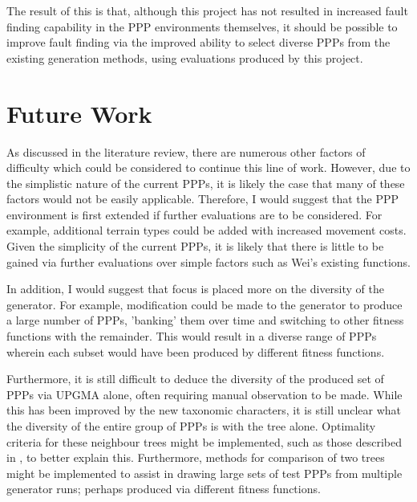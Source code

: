 \documentclass[authoryearcitations]{UoYCSproject}
\begin{document}
The result of this is that, although this project has not resulted in increased fault finding capability in the PPP environments themselves, it should be possible to improve fault finding via the improved ability to select diverse PPPs from the existing generation methods, using evaluations produced by this project.

\chapter{Future Work}
\label{cha:futWork}
As discussed in the literature review, there are numerous other factors of difficulty which could be considered to continue this line of work. However, due to the simplistic nature of the current PPPs, it is likely the case that many of these factors would not be easily applicable. Therefore, I would suggest that the PPP environment is first extended if further evaluations are to be considered. For example, additional terrain types could be added with increased movement costs. Given the simplicity of the current PPPs, it is likely that there is little to be gained via further evaluations over simple factors such as Wei's existing functions.

In addition, I would suggest that focus is placed more on the diversity of the generator. For example, modification could be made to the generator to produce a large number of PPPs, 'banking' them over time and switching to other fitness functions with the remainder. This would result in a diverse range of PPPs wherein each subset would have been produced by different fitness functions.

Furthermore, it is still difficult to deduce the diversity of the produced set of PPPs via UPGMA alone, often requiring manual observation to be made. While this has been improved by the new taxonomic characters, it is still unclear what the diversity of the entire group of PPPs is with the tree alone. Optimality criteria for these neighbour trees might be implemented, such as those described in \cite[chapter 11, p.~426]{phylo}, to better explain this. Furthermore, methods for comparison of two trees \cite[chapter 11 p.~504]{phylo} might be implemented to assist in drawing large sets of test PPPs from multiple generator runs; perhaps produced via different fitness functions.
\end{document}
